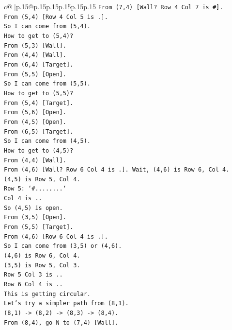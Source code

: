 \documentclass{article}
\begin{document}
{\begin{supertabular}{c@{$\;$}|p{.15\linewidth}@{}p{.15\linewidth}p{.15\linewidth}p{.15\linewidth}p{.15\linewidth}p{.15\linewidth}}
{{{\texttt{From (7,4) {[}Wall? Row 4 Col 7 is \#{]}.} \\
\texttt{From (5,4) {[}Row 4 Col 5 is .{]}.} \\
\texttt{So I can come from (5,4).} \\
\texttt{How to get to (5,4)?} \\
\texttt{From (5,3) {[}Wall{]}.} \\
\texttt{From (4,4) {[}Wall{]}.} \\
\texttt{From (6,4) {[}Target{]}.} \\
\texttt{From (5,5) {[}Open{]}.} \\
\texttt{So I can come from (5,5).} \\
\texttt{How to get to (5,5)?} \\
\texttt{From (5,4) {[}Target{]}.} \\
\texttt{From (5,6) {[}Open{]}.} \\
\texttt{From (4,5) {[}Open{]}.} \\
\texttt{From (6,5) {[}Target{]}.} \\
\texttt{So I can come from (4,5).} \\
\texttt{How to get to (4,5)?} \\
\texttt{From (4,4) {[}Wall{]}.} \\
\texttt{From (4,6) {[}Wall? Row 6 Col 4 is .{]}. Wait, (4,6) is Row 6, Col 4.} \\
\texttt{(4,5) is Row 5, Col 4.} \\
\texttt{Row 5: `\#........`} \\
\texttt{Col 4 is ..} \\
\texttt{So (4,5) is open.} \\
\texttt{From (3,5) {[}Open{]}.} \\
\texttt{From (5,5) {[}Target{]}.} \\
\texttt{From (4,6) {[}Row 6 Col 4 is .{]}.} \\
\texttt{So I can come from (3,5) or (4,6).} \\
\texttt{(4,6) is Row 6, Col 4.} \\
\texttt{(3,5) is Row 5, Col 3.} \\
\texttt{Row 5 Col 3 is ..} \\
\texttt{Row 6 Col 4 is ..} \\
\texttt{This is getting circular.} \\
\texttt{Let's try a simpler path from (8,1).} \\
\texttt{(8,1) {-}> (8,2) {-}> (8,3) {-}> (8,4).} \\
\texttt{From (8,4), go N to (7,4) {[}Wall{]}.} \\
}}}
\end{supertabular}}
\end{document}

